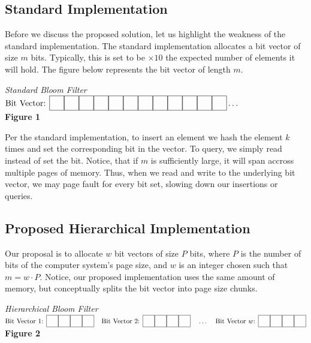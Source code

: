 \newcommand{\sep}{\hspace*{0.15in}}
\newcommand\cell{%
    \fbox{\rule{0.15in}{0pt}\rule[-0.5ex]{0pt}{0.15in}}}

\subsection{Standard Implementation}
Before we discuss the proposed solution, let us highlight the weakness of the standard implementation.
The standard implementation allocates a bit vector of size $m$ bits. Typically, this is set to be $\times 10$ the expected number of elements it will hold.
The figure below represents the bit vector of length $m$.

\begin{center}
    \textit{Standard Bloom Filter}
    \vspace{10pt}\\
    $\text{Bit Vector: } \cell\cell\cell\cell\cell\cell\cell\cell\cell\cell\cell\cell \ldots$
    \vspace{10pt}\\
    \textbf{Figure 1}
\end{center}

Per the standard implementation, to insert an element we hash the element $k$ times and set the corresponding bit in the vector.
To query, we simply read instead of set the bit.
Notice, that if $m$ is sufficiently large, it will span accross multiple pages of memory. 
Thus, when we read and write to the underlying bit vector, we may page fault for every bit set, slowing down our insertions or queries.

\subsection{Proposed Hierarchical Implementation}
Our proposal is to allocate $w$ bit vectors of size $P$ bits, where $P$ is the number of bits of the computer system's page size, and $w$ is an integer chosen such that $m = w \cdot P$.
Notice, our proposed implementation uses the same amount of memory, but conceptually splits the bit vector into page size chunks.

\begin{center}
    \textit{Hierarchical Bloom Filter}
    \vspace{10pt}\\
    $\text{Bit Vector 1: }\cell\cell\cell\cell \sep \text{Bit Vector 2: }\cell\cell\cell\cell \sep \ldots \sep \text{Bit Vector $w$: }\cell\cell\cell\cell$
    \vspace{10pt}\\
    \textbf{Figure 2}
\end{center}

